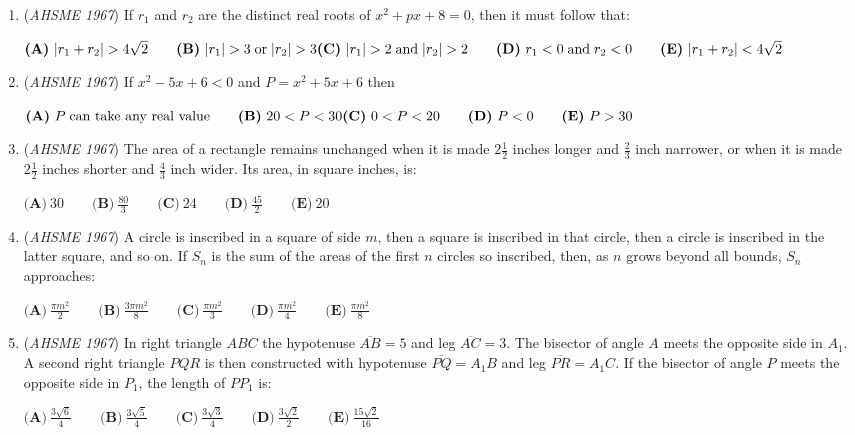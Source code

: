 \begin{enumerate}
	\item (\textit{AHSME 1967}) If $r_1$ and $r_2$ are the distinct real roots of $x^2+px+8=0$, then it must follow that:


 $\textbf{(A)}\ |r_1+r_2|>4\sqrt{2}\qquad \textbf{(B)}\ |r_1|>3 \; \text{or} \; |r_2| >3 \\ \textbf{(C)}\ |r_1|>2 \; \text{and} \; |r_2|>2\qquad \textbf{(D)}\ r_1<0 \; \text{and} \; r_2<0\qquad \textbf{(E)}\ |r_1+r_2|<4\sqrt{2}$


	\item (\textit{AHSME 1967}) If $x^2-5x+6<0$ and $P=x^2+5x+6$ then


 $\textbf{(A)}\ P \; \text{can take any real value} \qquad \textbf{(B)}\ 20<P<30\\ \textbf{(C)}\ 0<P<20 \qquad \textbf{(D)}\ P<0 \qquad \textbf{(E)}\ P>30$


	\item (\textit{AHSME 1967}) The area of a rectangle remains unchanged when it is made $2 \frac{1}{2}$ inches longer and $\frac{2}{3}$ inch narrower, or when it is made $2 \frac{1}{2}$ inches shorter and $\frac{4}{3}$ inch wider.  Its area, in square inches, is:


 $\textbf{(A)}\ 30\qquad \textbf{(B)}\ \frac{80}{3}\qquad \textbf{(C)}\ 24\qquad \textbf{(D)}\ \frac{45}{2}\qquad \textbf{(E)}\ 20$


	\item (\textit{AHSME 1967}) A circle is inscribed in a square of side $m$, then a square is inscribed in that  circle, then a circle is inscribed in the latter square, and so on.  If $S_n$ is the sum of the areas of the first $n$ circles so inscribed, then, as $n$ grows beyond all bounds, $S_n$ approaches:


 $\textbf{(A)}\ \frac{\pi m^2}{2}\qquad \textbf{(B)}\ \frac{3\pi m^2}{8}\qquad \textbf{(C)}\ \frac{\pi m^2}{3}\qquad \textbf{(D)}\ \frac{\pi m^2}{4}\qquad \textbf{(E)}\ \frac{\pi m^2}{8}$


	\item (\textit{AHSME 1967}) In right triangle $ABC$ the hypotenuse $\overline{AB}=5$ and leg $\overline{AC}=3$.  The bisector of angle $A$ meets the opposite side in $A_1$.  A second right triangle $PQR$ is then constructed with hypotenuse $\overline{PQ}=A_1B$ and leg $\overline{PR}=A_1C$.  If the bisector of angle $P$ meets the opposite side in $P_1$, the length of $PP_1$ is:


 $\textbf{(A)}\ \frac{3\sqrt{6}}{4}\qquad \textbf{(B)}\ \frac{3\sqrt{5}}{4}\qquad \textbf{(C)}\ \frac{3\sqrt{3}}{4}\qquad \textbf{(D)}\ \frac{3\sqrt{2}}{2}\qquad \textbf{(E)}\ \frac{15\sqrt{2}}{16}$



\end{enumerate}
